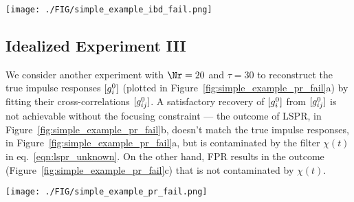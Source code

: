 \begin{figure*}
	\centering
	{
	\texttt{[image: ./FIG/simple\_example\_ibd\_fail.png]}
		}
	{
	\begin{tikzpicture}
		
	\end{tikzpicture}
	}
	\caption{Idealized Experiment II.
	Interferometric impulse responses:
	a) true; 
	b) estimated using IBD; c) estimated using FIBD.}
	\label{fig:simple_example_ibd_fail}
\end{figure*}




\subsection{Idealized Experiment III}
We consider another 
experiment with $\Nr=20$ and $\tau=30$
to
reconstruct the true impulse responses $\vecc{g^{0}_{i}}$ 
(plotted in Figure~\ref{fig:simple_example_pr_fail}a) 
by fitting their
cross-correlations
$\vecc{g^0_{ij}}$.
%
A satisfactory recovery of $\vecc{g^0_{i}}$ from $\vecc{g^0_{ij}}$ is not achievable without the focusing constraint ---
the outcome of LSPR, in Figure~\ref{fig:simple_example_pr_fail}b,
doesn't match the true impulse responses, in Figure~\ref{fig:simple_example_pr_fail}a, but is 
contaminated by the filter $\chi(t)$ in eq.~\ref{eqn:lspr_unknown}.
On the other hand, FPR results in the outcome (Figure~\ref{fig:simple_example_pr_fail}c) 
that is not contaminated by $\chi(t)$.
\begin{figure*}
	\centering
	{
	\texttt{[image: ./FIG/simple\_example\_pr\_fail.png]}
		}
	{
	\begin{tikzpicture}
		
	\end{tikzpicture}
	}
	\caption{Idealized Experiment III.
	a) True impulse responses. 
	b) Estimated impulse responses using LSPR.
	c) Estimated impulse responses using FPR.
	}
	\label{fig:simple_example_pr_fail}
\end{figure*}



